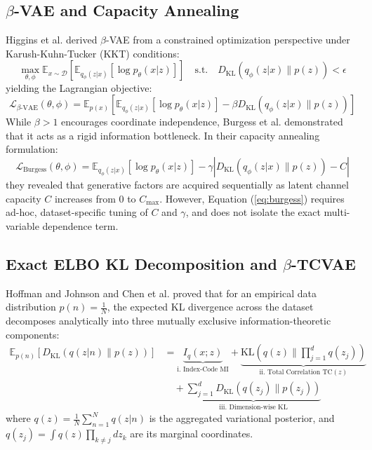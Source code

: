\documentclass[10pt,journal,compsoc]{IEEEtran}
\begin{document}
\subsection{$\beta$-VAE and Capacity Annealing}
Higgins et al. \cite{higgins2017beta} derived $\beta$-VAE from a constrained optimization perspective under Karush-Kuhn-Tucker (KKT) conditions:
\begin{equation}
\max_{\theta, \phi} \mathbb{E}_{x \sim \mathcal{D}} \left[ \mathbb{E}_{q_\phi(z|x)}[\log p_\theta(x|z)] \right] \quad \text{s.t.} \quad D_{\text{KL}}(q_\phi(z|x) \parallel p(z)) < \epsilon
\label{eq:beta_constraint}
\end{equation}
yielding the Lagrangian objective:
\begin{equation}
\mathcal{L}_{\beta\text{-VAE}}(\theta, \phi) = \mathbb{E}_{p(x)}\left[ \mathbb{E}_{q_\phi(z|x)}[\log p_\theta(x|z)] - \beta D_{\text{KL}}(q_\phi(z|x) \parallel p(z)) \right]
\label{eq:beta_vae}
\end{equation}
While $\beta > 1$ encourages coordinate independence, Burgess et al. \cite{burgess2018understanding} demonstrated that it acts as a rigid information bottleneck. In their capacity annealing formulation:
\begin{equation}
\mathcal{L}_{\text{Burgess}}(\theta, \phi) = \mathbb{E}_{q_\phi(z|x)}[\log p_\theta(x|z)] - \gamma \left| D_{\text{KL}}(q_\phi(z|x) \parallel p(z)) - C \right|
\label{eq:burgess}
\end{equation}
they revealed that generative factors are acquired sequentially as latent channel capacity $C$ increases from 0 to $C_{\text{max}}$. However, Equation (\ref{eq:burgess}) requires ad-hoc, dataset-specific tuning of $C$ and $\gamma$, and does not isolate the exact multi-variable dependence term.

\subsection{Exact ELBO KL Decomposition and $\beta$-TCVAE}
Hoffman and Johnson \cite{hoffman2016elbo} and Chen et al. \cite{chen2018isolating} proved that for an empirical data distribution $p(n) = \frac{1}{N}$, the expected KL divergence across the dataset decomposes analytically into three mutually exclusive information-theoretic components:
\begin{equation}
\begin{aligned}
\mathbb{E}_{p(n)} \left[ D_{\text{KL}}(q(z|n) \parallel p(z)) \right] &= \underbrace{I_q(x; z)}_{\text{i. Index-Code MI}} + \underbrace{\text{KL}\left(q(z) \parallel \prod_{j=1}^d q(z_j)\right)}_{\text{ii. Total Correlation } \text{TC}(z)} \\
&\quad + \underbrace{\sum_{j=1}^d D_{\text{KL}}(q(z_j) \parallel p(z_j))}_{\text{iii. Dimension-wise KL}}
\end{aligned}
\label{eq:decomposition}
\end{equation}
where $q(z) = \frac{1}{N}\sum_{n=1}^N q(z|n)$ is the aggregated variational posterior, and $q(z_j) = \int q(z) \prod_{k \ne j} dz_k$ are its marginal coordinates.
\end{document}
